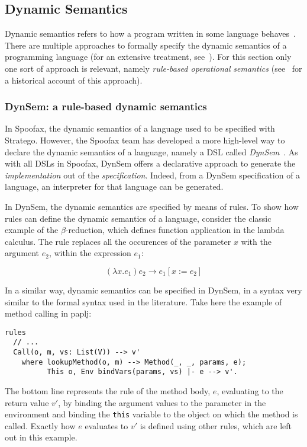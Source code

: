\subsection{Dynamic Semantics}
\label{sec-dynamic-semantics}
Dynamic semantics refers to how a program written in some language
behaves~\cite{Winskel93}. There are multiple approaches to
formally specify the dynamic semantics of a programming language (for
an extensive treatment, see~\cite{Winskel93}). For this section
only one sort of approach is relevant, namely \emph{rule-based operational}
\emph{semantics} (see~\cite{Plotkin04} for a historical account of this
approach).

\subsubsection{DynSem: a rule-based dynamic semantics}
\label{ssec-dynsem}
In Spoofax, the dynamic semantics of a language used to be specified
with Stratego. However, the Spoofax team has developed a more
high-level way to declare the dynamic semantics of a language, namely
a DSL called \emph{DynSem}~\cite{VerguNV15}. As with all DSLs in
Spoofax, DynSem offers a declarative approach to generate the
\emph{implementation} out of the \emph{specification}. Indeed, from a DynSem
specification of a language, an interpreter for that language can be
generated.

In DynSem, the dynamic semantics are specified by means of rules. To
show how rules can define the dynamic semantics of a language,
consider the classic example of the \(\beta\)-reduction, which defines
function application in the lambda calculus. The rule replaces all the
occurences of the parameter \(x\) with the argument \(e_2\), within the
expression \(e_1\):

\begin{equation}
(\lambda x.e_1) e_2 \rightarrow e_1[x := e_2]
\end{equation}

In a similar way, dynamic semantics can be specified in DynSem, in a
syntax very similar to the formal syntax used in the literature. Take
here the example of method calling in paplj:

\begin{verbatim}
rules
  // ...
  Call(o, m, vs: List(V)) --> v'
    where lookupMethod(o, m) --> Method(_, _, params, e);
          This o, Env bindVars(params, vs) |- e --> v'.
\end{verbatim}

The bottom line represents the rule of the method body, \(e\),
evaluating to the return value \(v'\), by binding the argument values to
the parameter in the environment and binding the \texttt{this} variable to
the object on which the method is called. Exactly how \(e\) evaluates to
\(v'\) is defined using other rules, which are left out in this example.
